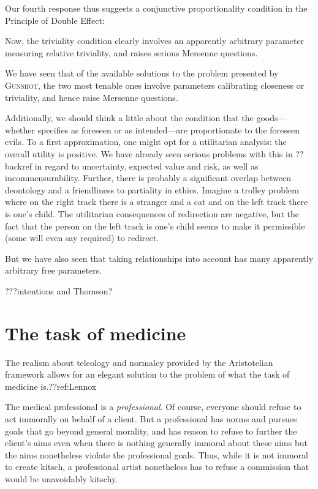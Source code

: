 Our fourth response thus suggests a conjunctive proportionality condition in the Principle of Double Effect:

Now, the triviality condition clearly involves an apparently arbitrary parameter measuring relative triviality, and raises serious 
Mersenne questions. 

We have seen that of the available solutions to the problem presented by \textsc{Gunshot}, the two most tenable ones involve 
parameters calibrating closeness or triviality, and hence raise Mersenne questions.

Additionally, we should think a little about the condition that the goods---whether specifies as foreseen or as intended---are 
proportionate to the foreseen evils. To a first approximation, one might opt for a utilitarian analysis: the overall
utility is positive. We have already seen serious problems with this in ??backref in regard to uncertainty, expected value
and risk, as well as incommensurability. Further, there is probably a significant overlap between deontology and a friendliness
to partiality in ethics. Imagine a trolley problem where on the right track there is a stranger and a cat and on the left track
there is one's child. The utilitarian consequences of redirection are negative, but the fact that the person on the left track
is one's child seems to make it permissible (some will even say required) to redirect. 

But we have also seen that taking relationships into account has many apparently arbitrary free parameters. 

???intentions and Thomson?


\section{The task of medicine}
The realism about teleology and normalcy provided by the Aristotelian framework
allows for an elegant solution to the problem of what the task of medicine is.??ref:Lennox

The medical professional is a \textit{professional}. Of course, everyone should refuse to act immorally on behalf of a client. But a professional has norms
and pursues goals that go beyond general morality, and has reason to refuse to further the client's aims even when there is nothing generally immoral about
these aims but the aims nonetheless violate the professional goals. Thus, while it is not immoral to create kitsch, a professional artist nonetheless has
to refuse a commission that would be unavoidably kitschy.


